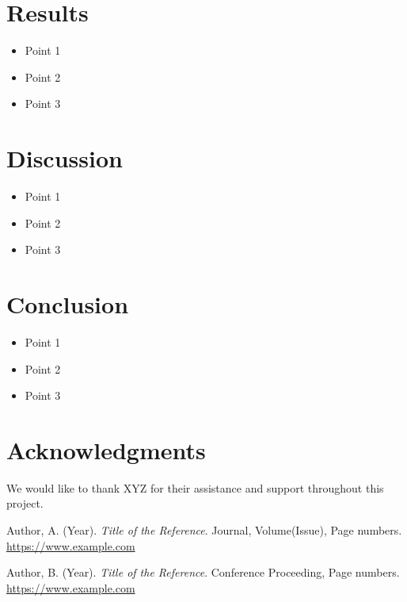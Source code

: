 \documentclass{article}
\begin{document}
\lipsum[2] %

\section{Results}
\begin{keypoints}
\begin{itemize}
  \item Point 1
  \item Point 2
  \item Point 3
\end{itemize}
\end{keypoints}

\lipsum[3] %

\section{Discussion}
\begin{keypoints}
\begin{itemize}
  \item Point 1
  \item Point 2
  \item Point 3
\end{itemize}
\end{keypoints}

\lipsum[4] %

\section{Conclusion}
\begin{keypoints}
\begin{itemize}
  \item Point 1
  \item Point 2
  \item Point 3
\end{itemize}
\end{keypoints}

\lipsum[5] %

\section*{Acknowledgments} %
We would like to thank XYZ for their assistance and support throughout this project.

\begin{thebibliography}{9}
Author, A. (Year). \textit{Title of the Reference}. Journal, Volume(Issue), Page numbers. \url{https://www.example.com}

Author, B. (Year). \textit{Title of the Reference}. Conference Proceeding, Page numbers. \url{https://www.example.com}
\end{thebibliography}
\end{document}
